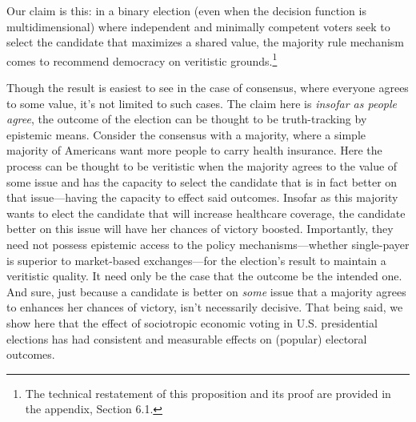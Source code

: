 \documentclass[11pt]{article}
\begin{document}
Our claim is this: in a binary election (even when the decision function is multidimensional) where independent and minimally competent voters seek to select the candidate that maximizes a shared value, the majority rule mechanism comes to recommend democracy on veritistic grounds.\footnote{The technical restatement of this proposition and its proof are provided in the appendix, Section 6.1.}

Though the result is easiest to see in the case of consensus, where everyone agrees to some value, it's not limited to such cases. The claim here is \emph{insofar as people agree}, the outcome of the election can be thought to be truth-tracking by epistemic means.  Consider the consensus with a majority, where a simple majority of Americans want more people to carry health insurance.
 Here the process can be thought to be veritistic when the majority agrees to the value of some issue and has the capacity to select the candidate that is in fact better on that issue---having the capacity to effect said outcomes. Insofar as this majority wants to elect the candidate that will increase healthcare coverage, the candidate better on this issue will have her chances of victory boosted. Importantly, they need not possess epistemic access to the policy mechanisms---whether single-payer is superior to market-based exchanges---for the election's result to maintain a veritistic quality. It need only be the case that the outcome be the intended one. And sure, just because a candidate is better on \emph{some} issue that a majority agrees to enhances her chances of victory, isn't necessarily decisive. That being said, we show here that the effect of sociotropic economic voting in U.S. presidential elections  has had consistent and measurable  effects on (popular) electoral outcomes.
\end{document}
